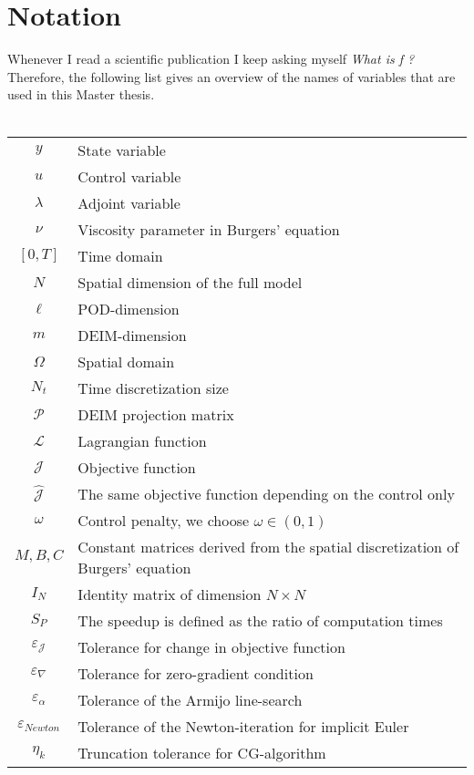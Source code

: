 \chapter{Notation}
Whenever I read a scientific publication I keep asking myself \textit{What is f ?} Therefore, the following list gives an overview of the names of variables that are used in this Master thesis.
\\ \\
\begin{tabular}[h]{c|l}
    $y$           & State variable \\
    $u$           & Control variable \\
    $\lambda$     & Adjoint variable \\
    $\nu$         & Viscosity parameter in Burgers' equation\\
    $[0,T]$       & Time domain\\
    $N$           & Spatial dimension of the full model\\
    $\ell$        & POD-dimension \\
    $m$           & DEIM-dimension \\
    $\Omega$      & Spatial domain \\
    $N_t$         & Time discretization size\\
    $\mathcal{P}$  & DEIM projection matrix \\
    $\mathcal{L}$ & Lagrangian function\\
    $\mathcal{J}$ & Objective function\\
    $\hat{\mathcal{J}}$&  The same objective function depending on the control only\\
    $\omega$      & Control penalty, we choose $\omega \in (0,1)$\\
    $M, B, C$     & Constant matrices derived from the spatial discretization of Burgers' equation\\
    $I_N$         & Identity matrix of dimension $N \times N$\\
    $S_P$         & The speedup is defined as the ratio of computation times\\
    $\varepsilon_\mathcal{J}$         & Tolerance for change in objective function\\
    $\varepsilon_\nabla$         & Tolerance for zero-gradient condition\\
    $\varepsilon_\alpha$         & Tolerance of the Armijo line-search \\
    $\varepsilon_{Newton}$         & Tolerance of the Newton-iteration for implicit Euler \\
    $\eta_k$         & Truncation tolerance for CG-algorithm
\end{tabular} 
